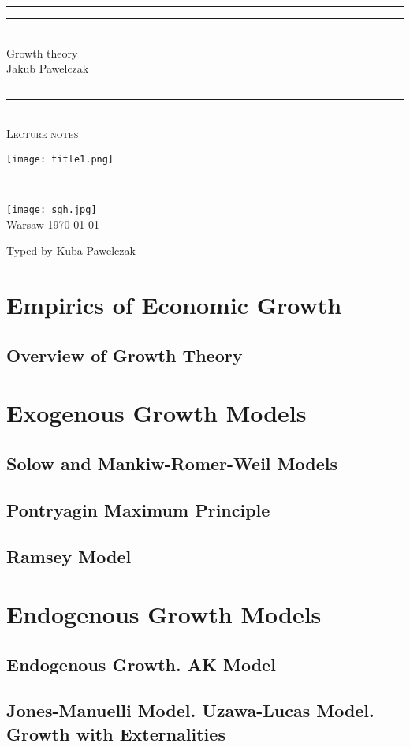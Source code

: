 \documentclass[11pt,paper,footinclude=true,headinclude=true,oneside]{scrbook} %
\newcommand*{\titleGP}{\begingroup %
\centering %
\vspace*{\baselineskip} %


\rule{\textwidth}{1.6pt}\vspace*{-\baselineskip}\vspace*{2pt} %
\rule{\textwidth}{0.4pt}\\[\baselineskip] %

{\LARGE Growth theory}\\[0.2\baselineskip] %
{ \Large  Jakub Pawelczak }\\[0.2\baselineskip] %
\rule{\textwidth}{0.4pt}\vspace*{-\baselineskip}\vspace{3.2pt} %
\rule{\textwidth}{1.6pt}\\[\baselineskip] %

\scshape %
Lecture notes\\[\baselineskip] %

\vspace{2 cm}

\texttt{[image: title1.png]} \\[0.5\baselineskip]


\vspace*{2\baselineskip} %

\\


\vfill %

\texttt{[image: sgh.jpg]} \\[0.3\baselineskip] 
Warsaw \today \par %
{ Typed by Kuba Pawelczak \par} %

\endgroup}
\begin{document}
\titleGP


	\pagestyle{scrheadings}
	
	\tableofcontents 


   
 
   
\newcommand{\ImageWidth}{15cm}
\part{Empirics of Economic Growth}
\chapter{Overview of Growth Theory}

\part{Exogenous Growth Models}
\chapter{Solow and Mankiw-Romer-Weil Models}

\chapter{Pontryagin Maximum Principle}

\chapter{Ramsey Model}

\part{Endogenous Growth Models}
\chapter{Endogenous Growth. AK Model}

\chapter{Jones-Manuelli Model. Uzawa-Lucas Model. Growth with Externalities }

\end{document}
